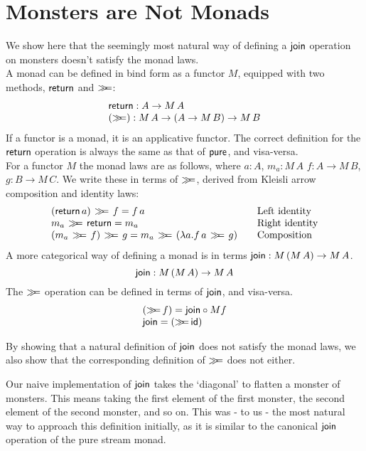 \section{Monsters are Not Monads}

We show here that the seemingly most natural way of defining a $\mathsf{join}$ operation on monsters doesn't satisfy the monad laws. \\

A monad can be defined in bind form as a functor $M$, equipped with two methods, $\mathsf{return}$ and $\mathbin{\gg\!\!=}$:
$$
\begin{array}{l}
\mathsf{return} : A \rightarrow M\, A \\
(\mathbin{\gg\!\!=}) : M\, A \rightarrow (A \rightarrow M\, B) \rightarrow M\, B
\end{array}
$$
If a functor is a monad, it is an applicative functor. The correct definition for the $\mathsf{return}$ operation is always the same as that of $\mathsf{pure}$, and visa-versa. \\

For a functor $M$ the monad laws are as follows, where $a:A$, $m_a : M\, A$
$f : A \rightarrow M\, B$, $g : B \rightarrow M\,C$. We write these in terms of $\mathbin{\gg\!\!=}$, derived from Kleisli arrow composition and identity laws:
$$
\begin{array}{l@{\qquad}l}
(\return\, a)\, \bind \, f = f\, a
  & \mbox{Left identity} \\
m_a\, \bind \, \return = m_a
  & \mbox{Right identity} \\
(m_a \, \bind \, f)\, \bind \, g = m_a\, \bind\, (\lambda a.  f\, a \, \bind \, g)
  & \mbox{Composition} \\
\end{array}
$$
A more categorical way of defining a monad is in terms $\mathsf{join} : M\,(M\, A) \rightarrow M\, A$.
$$
\mathsf{join} : M\,(M\, A) \rightarrow M\, A
$$
The $\mathbin{\gg\!\!=}$ operation can be defined in terms of $\mathsf{join}$, and visa-versa.
$$
\begin{array}{l}
(\mathbin{\gg\!\!=}\, f) = \mathsf{join} \circ M f \\
\mathsf{join} = (\mathbin{\gg\!\!=}\,\mathsf{id})
\end{array}
$$

By showing that a natural definition of $\mathsf{join}$ does not satisfy the monad laws, we also show that the corresponding definition of $\mathbin{\gg\!\!=}$ does not either.

Our naive implementation of $\mathsf{join}$ takes the `diagonal' to flatten a monster of monsters. This means taking the first element of the first monster, the second element of the second monster, and so on. This was - to us - the most natural way to approach this definition initially, as it is similar to the canonical $\mathsf{join}$ operation of the pure stream monad. \\

